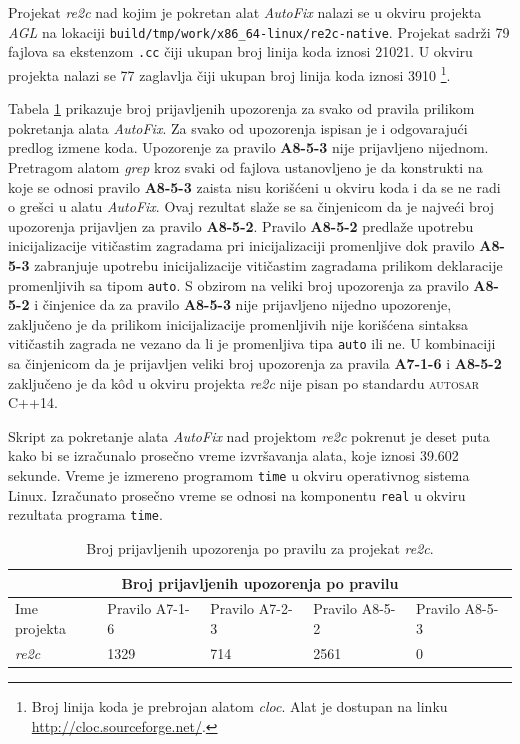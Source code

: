 \documentclass[12pt,oneside]{memoir}
\begin{document}
Projekat \textit{re2c} nad kojim je pokretan alat \textit{AutoFix} nalazi se u okviru projekta \textit{AGL} na lokaciji \texttt{build/tmp/work/x86\_64-linux/re2c-native}. Projekat sadr\v{z}i 79 fajlova sa ekstenzom \texttt{.cc} \v{c}iji ukupan broj linija koda iznosi 21021. U okviru projekta
nalazi se 77 zaglavlja \v{c}iji ukupan broj linija koda iznosi 3910 \footnote{Broj linija koda je prebrojan alatom \textit{cloc}. Alat je dostupan na linku \url{http://cloc.sourceforge.net/}.}. \par
Tabela \ref{fig:re2c} prikazuje broj prijavljenih upozorenja za svako od pravila prilikom pokretanja alata \textit{AutoFix}.
Za svako od upozorenja ispisan je i odgovaraju\'{c}i predlog izmene koda. Upozorenje za pravilo \textbf{A8-5-3} nije prijavljeno nijednom. Pretragom
alatom \textit{grep} kroz svaki od fajlova ustanovljeno je da konstrukti na koje se odnosi pravilo \textbf{A8-5-3} zaista nisu kori\v{s}\'{c}eni u okviru koda i da se ne radi o gre\v{s}ci u alatu \textit{AutoFix}. Ovaj rezultat sla\v{z}e se sa \v{c}injenicom da je najve\'{c}i broj upozorenja prijavljen za pravilo \textbf{A8-5-2}. Pravilo \textbf{A8-5-2} predla\v{z}e upotrebu inicijalizacije viti\v{c}astim zagradama pri inicijalizaciji promenljive dok pravilo \textbf{A8-5-3} zabranjuje upotrebu inicijalizacije viti\v{c}astim zagradama prilikom deklaracije promenljivih sa tipom \texttt{auto}. S obzirom na veliki broj upozorenja za pravilo \textbf{A8-5-2} i \v{c}injenice da za pravilo \textbf{A8-5-3} nije prijavljeno nijedno upozorenje, zaklju\v{c}eno je da prilikom inicijalizacije promenljivih nije kori\v{s}\'{c}ena sintaksa viti\v{c}astih zagrada ne vezano da li je promenljiva
tipa \texttt{auto} ili ne. U kombinaciji sa \v{c}injenicom da je prijavljen veliki broj upozorenja za pravila \textbf{A7-1-6} i \textbf{A8-5-2} zaklju\v{c}eno je da k\^{o}d u okviru projekta \textit{re2c} nije pisan po standardu \textsc{autosar} C++14. \par
Skript za pokretanje alata \textit{AutoFix} nad projektom \textit{re2c} pokrenut je deset puta kako bi se izra\v{c}unalo prose\v{c}no vreme izvr\v{s}avanja alata, koje iznosi 39.602 sekunde. Vreme je izmereno programom \texttt{time} u okviru operativnog sistema Linux. Izra\v{c}unato prose\v{c}no vreme se odnosi na komponentu \texttt{real} u okviru rezultata programa \texttt{time}.
\begin{table}[!h]
\begin{center}
\begin{tabular}{ |p{3cm}||p{2cm}|p{2cm}|p{2cm}|p{2cm}|  }
 \hline
 \multicolumn{5}{|c|}{Broj prijavljenih upozorenja po pravilu} \\
 \hline
 Ime projekta & Pravilo A7-1-6 & Pravilo A7-2-3 & Pravilo A8-5-2 & Pravilo A8-5-3\\
 \hline
 \textit{re2c}   & 1329            & 714             & 2561            & 0\\
 \hline
\end{tabular}
\caption{Broj prijavljenih upozorenja po pravilu za projekat \textit{re2c}.}
\label{fig:re2c}
\end{center}
\end{table}
\end{document}
